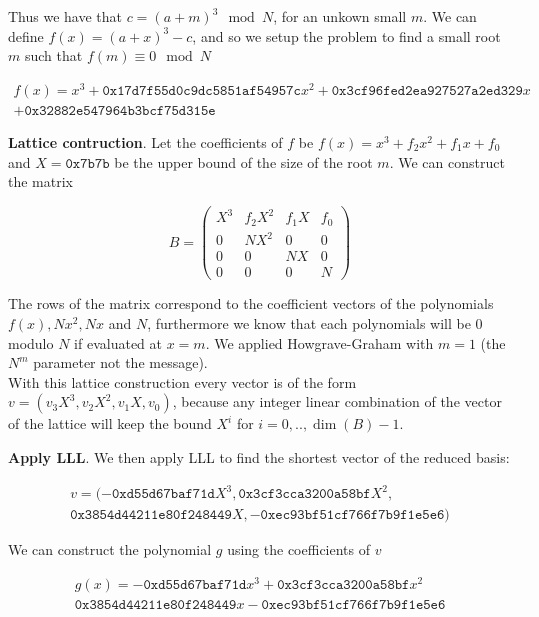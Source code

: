 \documentclass[a4paper,12pt]{report}
\begin{document}
\vspace*{10px}

Thus we have that $c = (a + m)^3 \mod N$, for an unkown small $m$.
We can define $f(x) = (a + x)^3 - c$, and so we setup the problem to find a small root $m$ such that $f(m) \equiv 0 \mod N$

\begin{align*}
    f(x) = x^3 + \texttt{0x17d7f55d0c9dc5851af54957c}x^2 + \texttt{0x3cf96fed2ea927527a2ed329}x\\
    + \texttt{0x32882e547964b3bcf75d315e}
\end{align*}

\vspace*{10px}

\textbf{Lattice contruction}. Let the coefficients of $f$ be $f(x) = x^3 + f_2x^2 + f_1x + f_0$
and $X = \texttt{0x7b7b}$ be the upper bound of the size of the root $m$. We can construct the matrix

\[
B = 
\label{mat:lattice_rsa}
\begin{pmatrix}
    X^3 & f_2X^2 & f_1X & f_0 \\
    0 & NX^2 & 0 & 0 \\
    0 & 0 & NX & 0 \\
    0 & 0 & 0 & N
\end{pmatrix}
\] 

The rows of the matrix correspond to the coefficient vectors of the polynomials $f(x), Nx^2, Nx$ and $N$, furthermore we know
that each polynomials will be 0 modulo $N$ if evaluated at $x = m$.
We applied Howgrave-Graham with $m=1$ (the $N^m$ parameter not the message).\\
With this lattice construction every vector is of the form $v = (v_3X^3, v_2X^2, v_1X, v_0)$, because any
integer linear combination of the vector of the lattice will keep the bound $X^i$ for $i=0,..,\dim(B)-1$.

\textbf{Apply LLL}. We then apply LLL to find the shortest vector of the reduced basis:

\[
    \begin{split}
    v = (-\texttt{0xd55d67baf71d}X^3, \texttt{0x3cf3cca3200a58bf}X^2, \\
    \texttt{0x3854d44211e80f248449}X, -\texttt{0xec93bf51cf766f7b9f1e5e6})
    \end{split}
\]

We can construct the polynomial $g$ using the coefficients of $v$

\[
    \begin{split}
        g(x) = -\texttt{0xd55d67baf71d}x^3 +  \texttt{0x3cf3cca3200a58bf}x^2 \\
        \texttt{0x3854d44211e80f248449}x -\texttt{0xec93bf51cf766f7b9f1e5e6}
    \end{split}
\]
\end{document}

